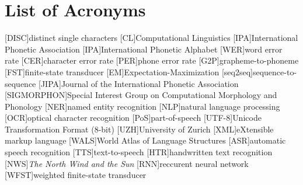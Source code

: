 {}
\chapter*{List of Acronyms}
\begin{acronym}[SIGMORPHON]\itemsep3pt
[DISC]{distinct single characters}
[CL]{Computational Linguistics}
[IPA]{International Phonetic Association}
[IPA]{International Phonetic Alphabet}
[WER]{word error rate}
[CER]{character error rate}
[PER]{phone error rate}
[G2P]{grapheme-to-phoneme}
[FST]{finite-state transducer}
[EM]{Expectation-Maximization}
[seq2seq]{sequence-to-sequence} 
[JIPA]{Journal of the International Phonetic Association}
[SIGMORPHON]{Special Interest Group on Computational  Morphology and Phonology}
[NER]{named entity recognition}
[NLP]{natural language processing}
[OCR]{optical character recognition}
[PoS]{part-of-speech}
[UTF-8]{Unicode Transformation Format (8-bit)}
[UZH]{University of Zurich}
[XML]{eXtensible markup language}
[WALS]{World Atlas of Language Structures}
[ASR]{automatic speech recognition}
[TTS]{text-to-speech}
[HTR]{handwritten text recognition}
[NWS]{\textit{The North Wind and the Sun}}
[RNN]{reccurent neural network}
[WFST]{weighted finite-state transducer}
\end{acronym}
